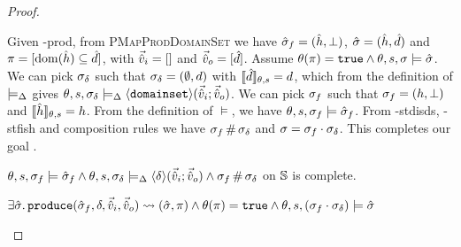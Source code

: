 \begin{proof}
\pfcase{$\delta = \domainset$}

\begin{hypvlist}
 Given \hyp{prod}, from \textsc{PMapProdDomainSet} we have $\hat{\sigma}_f=(\hat{h},\bot)$, $\hat{\sigma}=(\hat{h},\hat{d})$ and $\pi=[\operatorname{dom}(\hat{h})\subseteq \hat{d}]$, with $\vec{\hat{v}}_i=[]$ and $\vec{\hat{v}}_o=[\hat{d}]$.
 Assume $\theta(\pi)=\texttt{true} \land \theta,s,\sigma\models\hat{\sigma}$.
 We can pick $\sigma_\delta$ such that $\sigma_\delta=(\emptyset,d)$ with $\llbracket\hat{d}\rrbracket_{\theta,s}=d$, which from the definition of $\models_{\Delta}$ gives $\theta,s,\sigma_\delta\models_{\Delta}\left<\texttt{domainset}\right>\!(\vec{\hat{v}}_i;\vec{\hat{v}}_o)$.
 We can pick $\sigma_f$ such that $\sigma_f=(h,\bot)$ and $\llbracket\hat{h}\rrbracket_{\theta,s}=h$. From the definition of $\models$, we have $\theta,s,\sigma_f\models\hat{\sigma}_f$.
 From \hyp{stdisds}, \hyp{stfish} and composition rules we have $\sigma_f\operatorname{\#}\sigma_\delta$ and $\sigma=\sigma_f\cdot\sigma_\delta$. This completes our goal .
\end{hypvlist}


\pfassume \begin{hypvlist}
 $\theta, s, \sigma_f \models \hat{\sigma}_f \land \theta, s, \sigma_\delta \models_{\Delta} \left<\delta\right>\!(\vec{\hat{v}}_i;\vec{\hat{v}}_o) \land \sigma_f\operatorname{\#}\sigma_\delta$
 \produce{} on $\mathbb S$ is complete.
\end{hypvlist}
\pfprove \begin{goalvlist}
 $\exists \hat{\sigma}\ldotp \texttt{produce}(\hat{\sigma}_f,\delta,\vec{\hat{v}}_i,\vec{\hat{v}}_o)\rightsquigarrow (\hat{\sigma},\pi) \land \theta(\pi)=\texttt{true} \land \theta,s,(\sigma_f\cdot\sigma_\delta) \models \hat{\sigma}$
\end{goalvlist}

\pfcase{$\delta \in \preds_\mmdl$}


\end{proof}
